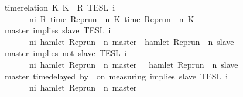 \begin{isabellebody}
\ \ {\isacharbar}\ {\isacartoucheopen}{\isasymlbrakk}\ time{\isacharminus}relation\ {\isasymlfloor}K\ K\ {\isasymin}\ R\ {\isasymrbrakk}\isactrlsub T\isactrlsub E\isactrlsub S\isactrlsub L\isactrlbsup {\isasymge}\ i\isactrlesup \ {\isacharequal}\isanewline
\ \ \ \ \ \ \ \ {\isacharbraceleft}\ {\isasymrho}{\isachardot}\ {\isasymforall}n{\isasymge}i{\isachardot}\ R\ {\isacharparenleft}time\ {\isacharparenleft}{\isacharparenleft}Rep{\isacharunderscore}run\ {\isasymrho}{\isacharparenright}\ n\ K\ time\ {\isacharparenleft}{\isacharparenleft}Rep{\isacharunderscore}run\ {\isasymrho}{\isacharparenright}\ n\ K\ {\isacharbraceright}{\isacartoucheclose}\isanewline
\ \ {\isacharbar}\ {\isacartoucheopen}{\isasymlbrakk}\ master\ implies\ slave\ {\isasymrbrakk}\isactrlsub T\isactrlsub E\isactrlsub S\isactrlsub L\isactrlbsup {\isasymge}\ i\isactrlesup \ {\isacharequal}\isanewline
\ \ \ \ \ \ \ \ {\isacharbraceleft}\ {\isasymrho}{\isachardot}\ {\isasymforall}n{\isasymge}i{\isachardot}\ hamlet\ {\isacharparenleft}{\isacharparenleft}Rep{\isacharunderscore}run\ {\isasymrho}{\isacharparenright}\ n\ master{\isacharparenright}\ {\isasymlongrightarrow}\ hamlet\ {\isacharparenleft}{\isacharparenleft}Rep{\isacharunderscore}run\ {\isasymrho}{\isacharparenright}\ n\ slave{\isacharparenright}\ {\isacharbraceright}{\isacartoucheclose}\isanewline
\ \ {\isacharbar}\ {\isacartoucheopen}{\isasymlbrakk}\ master\ implies\ not\ slave\ {\isasymrbrakk}\isactrlsub T\isactrlsub E\isactrlsub S\isactrlsub L\isactrlbsup {\isasymge}\ i\isactrlesup \ {\isacharequal}\isanewline
\ \ \ \ \ \ \ \ {\isacharbraceleft}\ {\isasymrho}{\isachardot}\ {\isasymforall}n{\isasymge}i{\isachardot}\ hamlet\ {\isacharparenleft}{\isacharparenleft}Rep{\isacharunderscore}run\ {\isasymrho}{\isacharparenright}\ n\ master{\isacharparenright}\ {\isasymlongrightarrow}\ {\isasymnot}\ hamlet\ {\isacharparenleft}{\isacharparenleft}Rep{\isacharunderscore}run\ {\isasymrho}{\isacharparenright}\ n\ slave{\isacharparenright}\ {\isacharbraceright}{\isacartoucheclose}\isanewline
\ \ {\isacharbar}\ {\isacartoucheopen}{\isasymlbrakk}\ master\ time{\isacharminus}delayed\ by\ {\isasymdelta}{\isasymtau}\ on\ measuring\ implies\ slave\ {\isasymrbrakk}\isactrlsub T\isactrlsub E\isactrlsub S\isactrlsub L\isactrlbsup {\isasymge}\ i\isactrlesup \ {\isacharequal}\isanewline
\ \ \ \ \ \ \ \ {\isacharbraceleft}\ {\isasymrho}{\isachardot}\ {\isasymforall}n{\isasymge}i{\isachardot}\ hamlet\ {\isacharparenleft}{\isacharparenleft}Rep{\isacharunderscore}run\ {\isasymrho}{\isacharparenright}\ n\ master{\isacharparenright}\ {\isasymlongrightarrow}\isanewline

\end{isabellebody}
